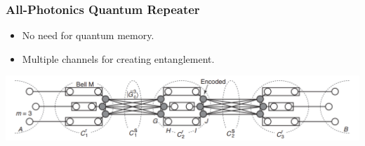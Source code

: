 \documentclass[aspectratio=169,xcolor=dvipsnames]{beamer}
\begin{document}
\begin{frame}
\frametitle{All-Photonics Quantum Repeater}
\begin{itemize}
  \item No need for quantum memory.
  \item Multiple channels for creating entanglement.
\end{itemize}
\begin{center}
    \includegraphics[width=\linewidth]{figs/photonics.png}
\end{center}
\end{frame}
\end{document}
